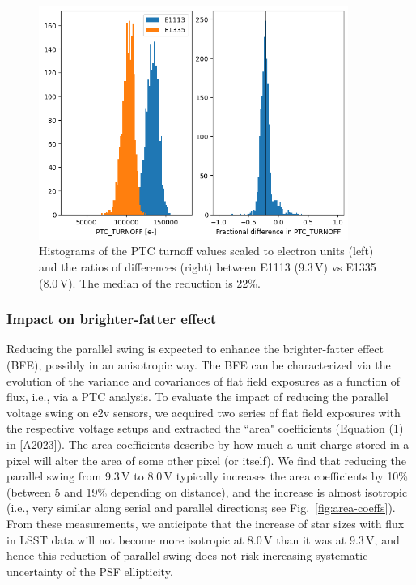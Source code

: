 \begin{figure}
\begin{centering}
\includegraphics[width=0.9\textwidth]{sections/figures/PtcTurnoffRatio.png}
\end{centering}
\caption{Histograms of the PTC turnoff values scaled to electron units (left) and the ratios of
differences (right) between E1113 (9.3\,V) vs E1335 (8.0\,V). The median of
the reduction is 22\%.}
\label{fig:ptc-turnoff}
\end{figure}



\subsubsection{Impact on brighter-fatter
effect}\label{impact-on-brighter-fatter-effect}

Reducing the parallel swing is expected to enhance the brighter-fatter
effect (BFE), possibly in an anisotropic way. The BFE can be
characterized via the evolution of the variance and covariances of
flat field exposures as a function of flux, i.e., via a PTC analysis. To evaluate the
impact of reducing the parallel voltage swing on e2v sensors, we
acquired two series of flat field exposures with the respective voltage
setups and extracted the ``area" coefficients 
(Equation (1) in \hyperref[A2023]{{[}A2023{]}}). The area coefficients describe by how much a unit charge stored in
a pixel will alter the area of some other pixel (or itself). We find that
reducing the parallel swing from 9.3\,V to 8.0\,V typically increases the
area coefficients by 10\% (between 5 and 19\% depending on distance),
and the increase is almost isotropic (i.e., very similar along serial and parallel
directions; see Fig.~\ref{fig:area-coeffs}). From these measurements, we anticipate that the increase of
star sizes with flux in LSST data will not become more isotropic at 8.0\,V than it was at
9.3\,V, and hence this reduction of parallel swing does not 
risk increasing systematic uncertainty of the PSF ellipticity.

